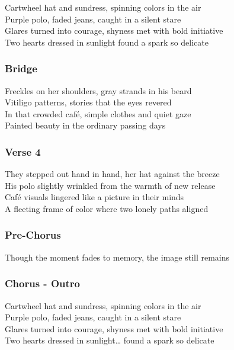 \documentclass[]{article}
\begin{document}
Cartwheel hat and sundress, spinning colors in the air\\
Purple polo, faded jeans, caught in a silent stare\\
Glares turned into courage, shyness met with bold initiative\\
Two hearts dressed in sunlight found a spark so delicate

\subsubsection{Bridge}\label{bridge-21}

Freckles on her shoulders, gray strands in his beard\\
Vitiligo patterns, stories that the eyes revered\\
In that crowded café, simple clothes and quiet gaze\\
Painted beauty in the ordinary passing days

\subsubsection{Verse 4}\label{verse-4-11}

They stepped out hand in hand, her hat against the breeze\\
His polo slightly wrinkled from the warmth of new release\\
Café visuals lingered like a picture in their minds\\
A fleeting frame of color where two lonely paths aligned

\subsubsection{Pre-Chorus}\label{pre-chorus-49}

Though the moment fades to memory, the image still remains

\subsubsection{Chorus - Outro}\label{chorus---outro-3}

Cartwheel hat and sundress, spinning colors in the air\\
Purple polo, faded jeans, caught in a silent stare\\
Glares turned into courage, shyness met with bold initiative\\
Two hearts dressed in sunlight\ldots{} found a spark so delicate
\end{document}
